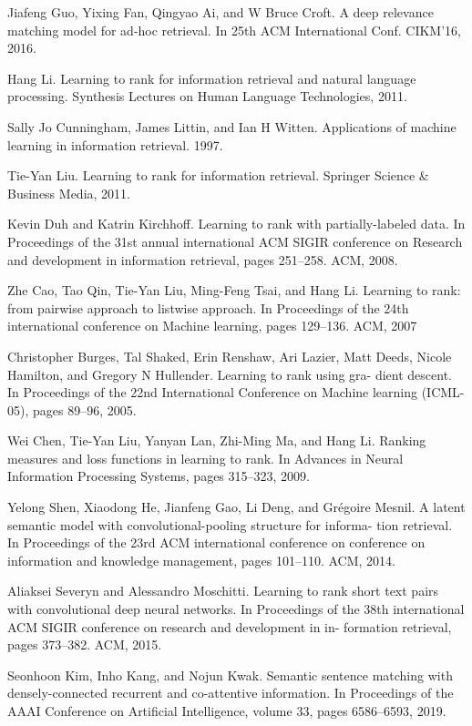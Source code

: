 \documentclass{llncs}
\begin{document}
\begin{thebibliography}{}
 Jiafeng Guo, Yixing Fan, Qingyao Ai, and W Bruce Croft. A deep relevance matching model for ad-hoc retrieval. In 25th ACM International Conf. CIKM’16, 2016.

 Hang Li. Learning to rank for information retrieval and natural language processing. Synthesis Lectures on Human Language Technologies, 2011.

 Sally Jo Cunningham, James Littin, and Ian H Witten. Applications of machine learning in information retrieval. 1997.

 Tie-Yan Liu. Learning to rank for information retrieval. Springer Science \& Business Media, 2011.

 Kevin Duh and Katrin Kirchhoff. Learning to rank with partially-labeled data. In Proceedings of the 31st annual international ACM SIGIR conference on Research and development in information retrieval, pages 251–258. ACM, 2008.

 Zhe Cao, Tao Qin, Tie-Yan Liu, Ming-Feng Tsai, and Hang Li. Learning to rank: from pairwise approach to listwise approach. In Proceedings of the 24th international conference on Machine learning, pages 129–136. ACM, 2007

 Christopher Burges, Tal Shaked, Erin Renshaw, Ari Lazier, Matt Deeds, Nicole Hamilton, and Gregory N Hullender. Learning to rank using gra- dient descent. In Proceedings of the 22nd International Conference on Machine learning (ICML-05), pages 89–96, 2005.

 Wei Chen, Tie-Yan Liu, Yanyan Lan, Zhi-Ming Ma, and Hang Li. Ranking measures and loss functions in learning to rank. In Advances in Neural Information Processing Systems, pages 315–323, 2009.

 Yelong Shen, Xiaodong He, Jianfeng Gao, Li Deng, and Grégoire Mesnil. A latent semantic model with convolutional-pooling structure for informa- tion retrieval. In Proceedings of the 23rd ACM international conference on conference on information and knowledge management, pages 101–110. ACM, 2014.

 Aliaksei Severyn and Alessandro Moschitti. Learning to rank short text pairs with convolutional deep neural networks. In Proceedings of the 38th international ACM SIGIR conference on research and development in in- formation retrieval, pages 373–382. ACM, 2015.

 Seonhoon Kim, Inho Kang, and Nojun Kwak. Semantic sentence matching with densely-connected recurrent and co-attentive information. In Proceedings of the AAAI Conference on Artificial Intelligence, volume 33, pages 6586–6593, 2019.


\end{thebibliography}
\end{document}
